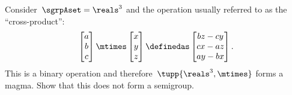 \begin{exercise}
    \label{ex:cross_prod}
    Consider~$\sgrpAset=\reals^3$ and the operation usually referred to as the ``cross-product'':
    \begin{equation}
        \begin{bmatrix}
            a \\ b\\ c
        \end{bmatrix}
        \mtimes
        \begin{bmatrix}
            x \\ y \\ z
        \end{bmatrix}
        \definedas
        \begin{bmatrix}
            bz-cy \\
            cx-az \\
            ay-bx
        \end{bmatrix}.
    \end{equation}
    This is a binary operation and therefore~$\tupp{\reals^3,\mtimes}$ forms a magma.
    Show that this does not form a semigroup.
\end{exercise}
%
